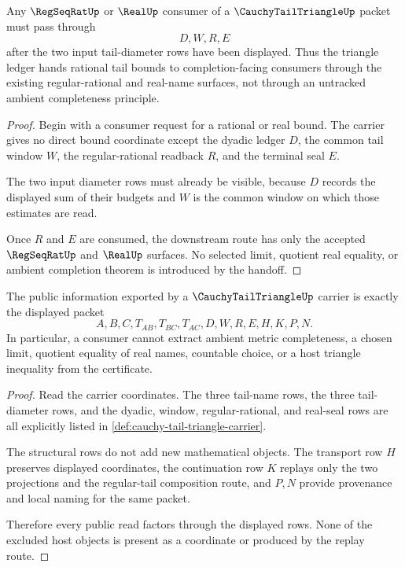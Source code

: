 \begin{theorem}
\label{thm:cauchy-tail-triangle-regseqrat-handoff}
Any $\RegSeqRatUp$ or $\RealUp$ consumer of a $\CauchyTailTriangleUp$ packet must pass through
$$
D,W,R,E
$$
after the two input tail-diameter rows have been displayed. Thus the triangle ledger hands rational tail bounds to completion-facing consumers through the existing regular-rational and real-name surfaces, not through an untracked ambient completeness principle.
\end{theorem}
\begin{proof}
Begin with a consumer request for a rational or real bound. The carrier gives no direct bound coordinate except the dyadic ledger $D$, the common tail window $W$, the regular-rational readback $R$, and the terminal seal $E$.

The two input diameter rows must already be visible, because $D$ records the displayed sum of their budgets and $W$ is the common window on which those estimates are read.

Once $R$ and $E$ are consumed, the downstream route has only the accepted $\RegSeqRatUp$ and $\RealUp$ surfaces. No selected limit, quotient real equality, or ambient completion theorem is introduced by the handoff.
\end{proof}

\begin{theorem}
\label{thm:cauchy-tail-triangle-nonescape}
The public information exported by a $\CauchyTailTriangleUp$ carrier is exactly the displayed packet
$$
A,B,C,T_{AB},T_{BC},T_{AC},D,W,R,E,H,K,P,N .
$$
In particular, a consumer cannot extract ambient metric completeness, a chosen limit, quotient equality of real names, countable choice, or a host triangle inequality from the certificate.
\end{theorem}
\begin{proof}
Read the carrier coordinates. The three tail-name rows, the three tail-diameter rows, and the dyadic, window, regular-rational, and real-seal rows are all explicitly listed in \autoref{def:cauchy-tail-triangle-carrier}.

The structural rows do not add new mathematical objects. The transport row $H$ preserves displayed coordinates, the continuation row $K$ replays only the two projections and the regular-tail composition route, and $P,N$ provide provenance and local naming for the same packet.

Therefore every public read factors through the displayed rows. None of the excluded host objects is present as a coordinate or produced by the replay route.
\end{proof}

